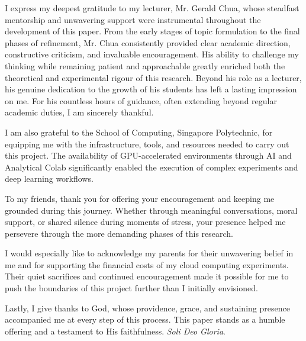 \begin{acknowledgments}

I express my deepest gratitude to my lecturer, Mr. Gerald Chua, whose steadfast mentorship and unwavering support were instrumental throughout the development of this paper. From the early stages of topic formulation to the final phases of refinement, Mr. Chua consistently provided clear academic direction, constructive criticism, and invaluable encouragement. His ability to challenge my thinking while remaining patient and approachable greatly enriched both the theoretical and experimental rigour of this research. Beyond his role as a lecturer, his genuine dedication to the growth of his students has left a lasting impression on me. For his countless hours of guidance, often extending beyond regular academic duties, I am sincerely thankful.

I am also grateful to the School of Computing, Singapore Polytechnic, for equipping me with the infrastructure, tools, and resources needed to carry out this project. The availability of GPU-accelerated environments through AI and Analytical Colab significantly enabled the execution of complex experiments and deep learning workflows.

To my friends, thank you for offering your encouragement and keeping me grounded during this journey. Whether through meaningful conversations, moral support, or shared silence during moments of stress, your presence helped me persevere through the more demanding phases of this research.

I would especially like to acknowledge my parents for their unwavering belief in me and for supporting the financial costs of my cloud computing experiments. Their quiet sacrifices and continued encouragement made it possible for me to push the boundaries of this project further than I initially envisioned.

Lastly, I give thanks to God, whose providence, grace, and sustaining presence accompanied me at every step of this process. This paper stands as a humble offering and a testament to His faithfulness. \textit{Soli Deo Gloria}.

\end{acknowledgments}

